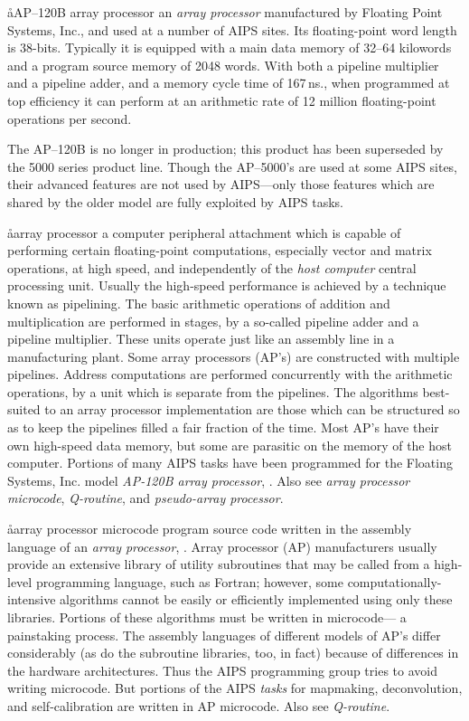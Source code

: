 \aa{AP--120B array processor}
an {\it array processor} manufactured by Floating Point Systems, Inc.,
and used at a number of AIPS sites.
Its floating-point word length is 38-bits.
Typically it is equipped with a main data memory of 32--64
kilowords and a program source memory of 2048 words.
With both a pipeline multiplier and a pipeline adder,
and a memory cycle time of 167\,ns.,
when programmed at top efficiency it can perform
at an arithmetic rate of 12 million floating-point operations per second.
\par
The AP--120B is no longer in production; this product has been superseded
by the 5000 series product line.
Though the AP--5000's are used at some AIPS sites, their advanced
features are not used by AIPS---only those features which are shared by the
older model are fully exploited by AIPS tasks.

\aa{array processor}
a computer peripheral attachment which is capable of performing
certain floating-point computations, especially vector and matrix
operations, at high speed, and independently of the {\it host computer}
central processing unit.
Usually the high-speed performance is achieved by a technique known
as pipelining.
The basic arithmetic operations of addition and multiplication
are performed in stages, by a so-called pipeline adder and a pipeline
multiplier.
These units operate just like an assembly line in a manufacturing plant.
Some array processors (AP's) are constructed with multiple pipelines.
Address computations are performed concurrently with the arithmetic
operations, by a unit which is separate from the pipelines.
The algorithms best-suited to an array processor
implementation are those which can be structured so as to keep
the pipelines filled a fair fraction of the time.
Most AP's have their own high-speed data memory,
but some are parasitic on the memory of the host computer.
Portions of many AIPS tasks have been programmed for
the Floating Systems, Inc. model {\it AP-120B array processor}, \qv.
Also see {\it array processor microcode}, {\it Q-routine},
and {\it pseudo-array processor}.

\aa{array processor microcode}
program source code written in the assembly language of an
{\it array processor}, \qv.
Array processor (AP) manufacturers usually provide an extensive
library of utility subroutines that may be called from a high-level
programming language, such as Fortran;
however, some computationally-intensive algorithms cannot be
easily or efficiently implemented using only these libraries.
Portions of these algorithms must be written in microcode---%
a painstaking process.
The assembly languages of different models of AP's differ considerably
(as do the subroutine libraries, too, in fact)
because of differences in the hardware architectures.
Thus the AIPS programming group tries to avoid writing microcode.
But portions of the AIPS {\it tasks} for mapmaking, deconvolution,
and self-calibration are written in AP microcode.
Also see {\it Q-routine}.


